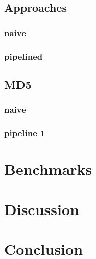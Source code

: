 \documentclass[a4paper]{article}
\begin{document}
\subsection{Approaches}
\label{sec:org1509e68}

\subsubsection{naive}
\label{sec:orgdf13a6a}

\subsubsection{pipelined}
\label{sec:org9b3e193}

\subsection{MD5}
\label{sec:orgbcebb52}

\subsubsection{naive}
\label{sec:orgd21d4bf}

\subsubsection{pipeline 1}
\label{sec:orgd326d33}

\section{Benchmarks}
\label{sec:org21b0cbe}

\section{Discussion}
\label{sec:orga855a14}

\section{Conclusion}
\label{sec:org8369c14}




\begin{appendix}

\end{appendix}
\end{document}
